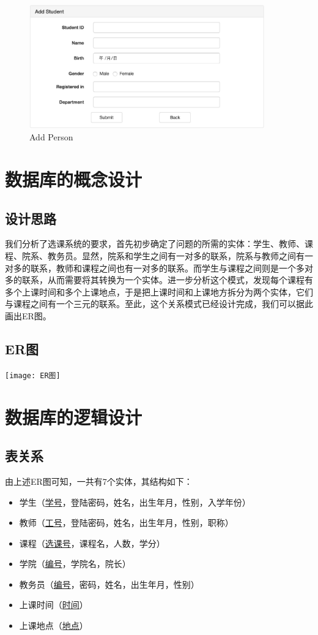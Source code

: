 \documentclass[a4paper, 11pt, nofonts, nocap, fancyhdr]{ctexart}
\begin{document}
	\vspace{0.8cm}

	\begin{figure}[ht]
		\centering
		\includegraphics[width=4in]{adadd}
		\caption{Add Person}
	\end{figure}

\newpage
\section{数据库的概念设计}

\subsection{设计思路}
我们分析了选课系统的要求，首先初步确定了问题的所需的实体：学生、教师、课程、院系、教务员。显然，院系和学生之间有一对多的联系，院系与教师之间有一对多的联系，教师和课程之间也有一对多的联系。而学生与课程之间则是一个多对多的联系，从而需要将其转换为一个实体。进一步分析这个模式，发现每个课程有多个上课时间和多个上课地点，于是把上课时间和上课地方拆分为两个实体，它们与课程之间有一个三元的联系。至此，这个关系模式已经设计完成，我们可以据此画出ER图。

\subsection{ER图}
	\texttt{[image: ER图]}

\section{数据库的逻辑设计}

\subsection{表关系}
由上述ER图可知，一共有7个实体，其结构如下：
\begin{itemize}[leftmargin=4em]
    \item 学生（\underline{学号}，登陆密码，姓名，出生年月，性别，入学年份）
    \item 教师（\underline{工号}，登陆密码，姓名，出生年月，性别，职称）
    \item 课程（\underline{选课号}，课程名，人数，学分）
    \item 学院（\underline{编号}，学院名，院长）
    \item 教务员（\underline{编号}，密码，姓名，出生年月，性别）
    \item 上课时间（\underline{时间}）
    \item 上课地点（\underline{地点}）
\end{itemize}
\end{document}
